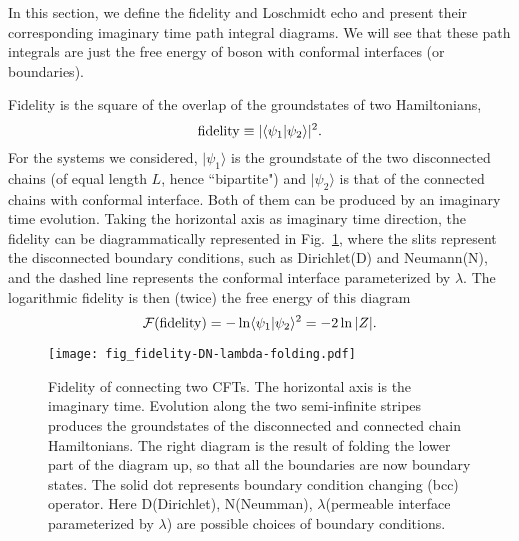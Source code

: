 
In this section, we define the fidelity and Loschmidt echo and present their corresponding imaginary time path integral diagrams.  We will see that these path integrals are just the free energy of boson with conformal interfaces (or boundaries). 

Fidelity is the square of the overlap of the groundstates of two Hamiltonians, 
\begin{equation}
{\rm fidelity} \equiv |\langle \psi_1 |\psi_2  \rangle |^2 .
\end{equation}
For the systems we considered, $|\psi_1 \rangle$ is the groundstate of the two disconnected chains (of equal length $L$, hence ``bipartite") and $|\psi_2\rangle$ is that of the connected chains with conformal interface. Both of them can be produced by an imaginary time evolution. Taking the horizontal axis as imaginary time direction, the fidelity can be diagrammatically represented in Fig.~\ref{fig:fidel}, where the slits represent the disconnected boundary conditions, such as Dirichlet(D) and Neumann(N), and the dashed line represents the conformal interface parameterized by $\lambda$. The logarithmic fidelity is then (twice) the free energy of this diagram
\begin{equation}
\mathcal{F}( {\rm fidelity} )  = - \ln \langle \psi_1 |\psi_2 \rangle^2 = - 2 \ln |Z|.
\end{equation}

\begin{figure}[h]
\texttt{[image: fig\_fidelity-DN-lambda-folding.pdf]}
\caption{Fidelity of connecting two CFTs. The horizontal axis is the imaginary time. Evolution along the two semi-infinite stripes produces the groundstates of the disconnected and connected chain Hamiltonians. The right diagram is the result of folding the lower part of the diagram up, so that all the boundaries are now boundary states. The solid dot represents boundary condition changing (bcc) operator. Here D(Dirichlet), N(Neumman), $\lambda$(permeable interface parameterized by $\lambda$) are possible choices of boundary conditions.}
\label{fig:fidel}
\end{figure}

